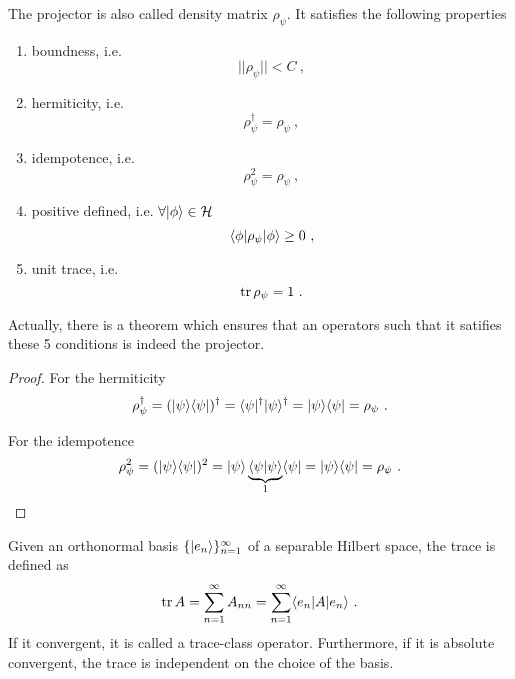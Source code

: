     The projector is also called density matrix $\rho_\psi$. It satisfies the following properties 
    \begin{enumerate}
        \item boundness, i.e. 
            \begin{equation*}
                ||\rho_\psi|| < C~,
            \end{equation*}
        \item hermiticity, i.e. 
            \begin{equation*}
                \rho_\psi^\dagger = \rho_\psi ~,
            \end{equation*}
        \item idempotence, i.e. 
            \begin{equation*}
                \rho_\psi^2 = \rho_\psi ~,
            \end{equation*}
        \item positive defined, i.e. $\forall \vert\phi\rangle \in \mathcal H$
            \begin{equation*}
                \langle\phi\vert \rho_\psi \vert\phi\rangle \geq 0 ~,
            \end{equation*}
        \item unit trace, i.e. 
            \begin{equation*}
                \operatorname{tr} \rho_\psi = 1 ~.
            \end{equation*}
    \end{enumerate}
    Actually, there is a theorem which ensures that an operators such that it satifies these 5 conditions is indeed the projector.
    \begin{proof}
        For the hermiticity
        \begin{equation*}
            \rho_\psi^\dagger = (\vert\psi\rangle \langle\psi\vert)^\dagger = \langle\psi\vert^\dagger \vert\psi\rangle^\dagger = \vert\psi\rangle \langle\psi\vert = \rho_\psi ~.
        \end{equation*}

        For the idempotence
        \begin{equation*}
            \rho_\psi^2 = (\vert\psi\rangle \langle\psi\vert)^2 = \vert\psi\rangle \underbrace{\langle\psi\vert\psi\rangle}_1 \langle\psi\vert = \vert\psi\rangle \langle\psi\vert = \rho_\psi ~.
        \end{equation*}
    \end{proof}

    Given an orthonormal basis $\{\vert e_n\rangle\}_{n=1}^\infty$ of a separable Hilbert space, the trace is defined as 
    \begin{equation*}
        \operatorname{tr} A = \sum_{n=1}^\infty A_{nn} = \sum_{n=1}^\infty \langle e_n\vert A \vert e_n\rangle ~.
    \end{equation*}
    If it convergent, it is called a trace-class operator. Furthermore, if it is absolute convergent, the trace is independent on the choice of the basis.

